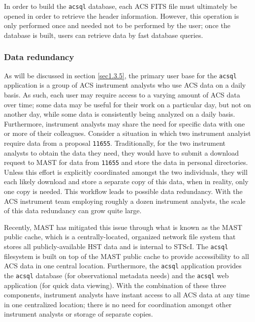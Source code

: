 \documentclass[10pt,journal,compsoc]{IEEEtran}
\begin{document}
In order to build the \texttt{acsql} database, each ACS FITS file must ultimately be opened in order to retrieve the header information.  However, this operation is only
performed once and needed not to be performed by the user; once the database is built, users can retrieve data by fast database queries.


\subsubsection{Data redundancy} \label{1.3.3}

As will be discussed in section \ref{sec1.3.5}, the primary user base for the \texttt{acsql} application is a group of ACS instrument analysts who use ACS data on a daily
basis.  As such, each user may require access to a varying amount of ACS data over time; some data may be useful for their work on a particular day, but not on another day,
while some data is consistently being analyzed on a daily basis.  Furthermore, instrument analysts may share the need for specific data with one or more of their colleagues.
Consider a situation in which two instrument analyist require data from a proposal \texttt{11655}. Traditionally, for the two instrument analysts to obtain the data they
need, they would have to submit a download request to MAST for data from \texttt{11655} and store the data in personal directories.  Unless this effort is explicitly
coordinated amongst the two individuals, they will each likely download and store a separate copy of this data, when in reality, only one copy is needed.  This workflow leads to
possible data redundancy.  With the ACS instrument team employing roughly a dozen instrument analysts, the scale of this data redundancy can grow quite large.

Recently, MAST has mitigated this issue through what is known as the MAST public cache, which is a centrally-located, organized network file system that stores all
publicly-available HST data and is internal to STScI.  The \texttt{acsql} filesystem is built on top of the MAST public cache to provide accessibility to all ACS data in one
central location.  Furthermore, the \texttt{acsql} application provides the \texttt{acsql} database (for observational metadata needs) and the \texttt{acsql} web application
(for quick data viewing).  With the combination of these three components, instrument analysts have instant access to all ACS data at any time in one centralized location; there is
no need for coordination amongst other instrument analysts or storage of separate copies.
\end{document}
